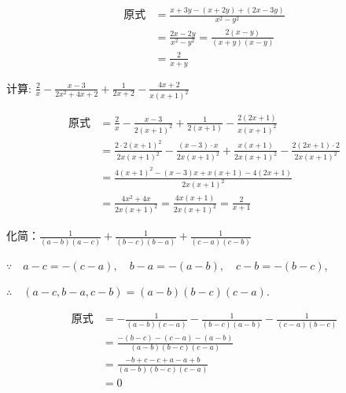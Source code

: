 \begin{solution}
    \[\begin{split}
        \text{原式}&=\frac{x+3y-(x+2y)+(2x-3y)}{x^2-y^2}\\
&=\frac{2x-2y}{x^2-y^2}=\frac{2(x-y)}{(x+y)(x-y)}\\
        &=\frac{2}{x+y}
    \end{split}\]
\end{solution}


\begin{example}
    计算:
$\frac{2}{x}-\frac{x-3}{2 x^{2}+4 x+2}+\frac{1}{2 x+2}-\frac{4 x+2}{x(x+1)^{2}}$
\end{example}

\begin{solution}
\[\begin{split}
    \text{原式}&= \frac{2}{x}-\frac{x-3}{2(x+1)^{2}}+\frac{1}{2(x+1)}-\frac{2(2 x+1)}{x(x+1)^{2}} \\
    &= \frac{2 \cdot 2(x+1)^{2}}{2 x(x+1)^{2}}-\frac{(x-3) \cdot x}{2 x(x+1)^{2}}+\frac{x(x+1)}{2 x(x+1)^{2}}-\frac{2(2 x+1) \cdot 2}{2 x(x+1)^{2}} \\
    &=\frac{4(x+1)^{2}-(x-3) x+x(x+1)-4(2 x+1)}{2 x(x+1)^{2}}\\
&=\frac{4 x^{2}+4 x}{2 x(x+1)^{2}}=\frac{4 x(x+1)}{2 x(x+1)^{2}}=\frac{2}{x+1}
\end{split}\]
\end{solution}

\begin{example}
    化简：$\frac{1}{(a-b)(a-c)}+\frac{1}{(b-c)(b-a)}+\frac{1}{(c-a)(c-b)}$
    \end{example}

\begin{analyze}
    $\because \quad a-c=-(c-a),\quad  b-a=-(a-b),\quad c-b=-(b-c)$,

    $\therefore\quad (a-c,b-a,c-b)=(a-b)(b-c)(c-a)$.
\end{analyze}

\begin{solution}
   \[\begin{split}
    \text{原式}&=-\frac{1}{(a-b)(c-a)}-\frac{1}{(b-c)(a-b)}-\frac{1}{(c-a)(b-c)}\\
    &=\frac{-(b-c)-(c-a)-(a-b)}{(a-b)(b-c)(c-a)}\\
    &=\frac{-b+c-c+a-a+b}{(a-b)(b-c)(c-a)}\\
    &=0     
   \end{split}\] 
\end{solution}

